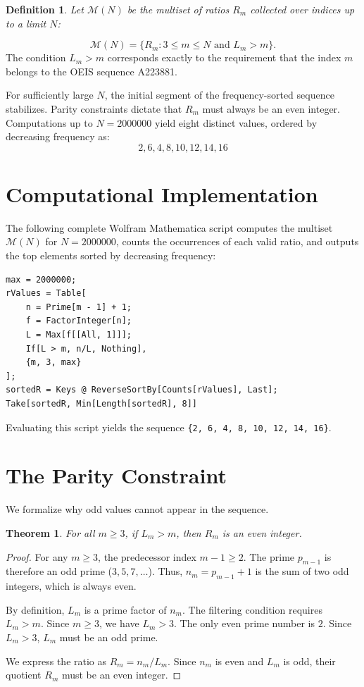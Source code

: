 \documentclass[11pt,fleqn]{article}
\newtheorem{theorem}{Theorem}
\newtheorem{definition}{Definition}
\begin{document}
\begin{definition}
Let $\mathcal{M}(N)$ be the multiset of ratios $R_m$ collected over indices up to a limit $N$:
\end{definition}
\begin{equation*}
    \mathcal{M}(N) = \{ R_m : 3 \leq m \leq N \text{ and } L_m > m \}.
\end{equation*}
The condition $L_m > m$ corresponds exactly to the requirement that the index $m$ belongs to the OEIS sequence A223881.

For sufficiently large $N$, the initial segment of the frequency-sorted sequence stabilizes. Parity constraints dictate that $R_m$ must always be an even integer. Computations up to $N = 2000000$ yield eight distinct values, ordered by decreasing frequency as:
\begin{equation*}
    2, 6, 4, 8, 10, 12, 14, 16
\end{equation*}

\section{Computational Implementation}
The following complete Wolfram Mathematica script computes the multiset $\mathcal{M}(N)$ for $N = 2000000$, counts the occurrences of each valid ratio, and outputs the top elements sorted by decreasing frequency:

\begin{lstlisting}
max = 2000000;
rValues = Table[
    n = Prime[m - 1] + 1;
    f = FactorInteger[n];
    L = Max[f[[All, 1]]];
    If[L > m, n/L, Nothing],
    {m, 3, max}
];
sortedR = Keys @ ReverseSortBy[Counts[rValues], Last];
Take[sortedR, Min[Length[sortedR], 8]]
\end{lstlisting}

Evaluating this script yields the sequence \texttt{\{2, 6, 4, 8, 10, 12, 14, 16\}}.

\section{The Parity Constraint}
We formalize why odd values cannot appear in the sequence.
\begin{theorem}
For all $m \geq 3$, if $L_m > m$, then $R_m$ is an even integer.
\end{theorem}
\begin{proof}
For any $m \geq 3$, the predecessor index $m-1 \geq 2$. The prime $p_{m-1}$ is therefore an odd prime ($3, 5, 7, \dots$). Thus, $n_m = p_{m-1} + 1$ is the sum of two odd integers, which is always even. 

By definition, $L_m$ is a prime factor of $n_m$. The filtering condition requires $L_m > m$. Since $m \geq 3$, we have $L_m > 3$. The only even prime number is $2$. Since $L_m > 3$, $L_m$ must be an odd prime.

We express the ratio as $R_m = n_m / L_m$. Since $n_m$ is even and $L_m$ is odd, their quotient $R_m$ must be an even integer.
\end{proof}
\end{document}
